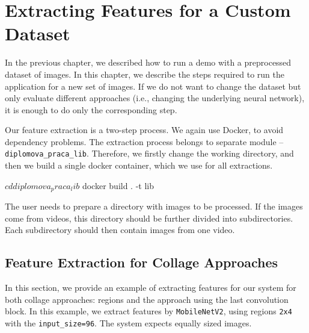 \chapter{Extracting Features for a Custom Dataset}
\label{ch:custom_dataset}

In the previous chapter, we described how to run a demo with a preprocessed dataset of images. In this chapter, we describe the steps required to run the application for a new set of images. If we do not want to change the dataset but only evaluate different approaches (i.e., changing the underlying neural network), it is enough to do only the corresponding step.

Our feature extraction is a two-step process. We again use Docker, to avoid dependency problems. The extraction process belongs to separate module -- \verb+diplomova_praca_lib+. Therefore, we firstly change the working directory, and then we build a single docker container, which we use for all extractions.

\vspace{0.5cm}
\begin{boxedverbatim}
$ cd diplomova_praca_lib
$ docker build . -t lib
\end{boxedverbatim}
\vspace{0.5cm}

The user needs to prepare a directory with images to be processed. If the images come from videos, this directory should be further divided into subdirectories. Each subdirectory should then contain images from one video.

\section{Feature Extraction for Collage Approaches}

In this section, we provide an example of extracting features for our system for both collage approaches: regions and the approach using the last convolution block. In this example, we extract features by \verb+MobileNetV2+, using regions \verb+2x4+ with the \verb+input_size=96+. The system expects equally sized images.

\vspace{0.5cm}

